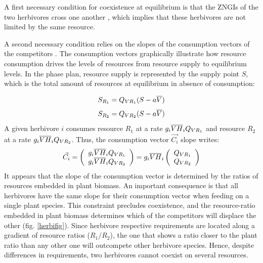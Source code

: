 \documentclass[12pt]{article}
\newcommand\barre[1]{\overline{\rule{0pt}{1.5ex}#1}}
\begin{document}
A first necessary condition for coexistence at equilibrium is that the ZNGIs of the two herbivores cross one another \citep{Tilman1982}, which implies that these herbivores are not limited by the same resource. 
\par
A second necessary condition relies on the slopes of the consumption vectors of the competitors %
\citep{Tilman1982}.  The consumption vectors graphically illustrate how resource consumption drives the levels of resources from resource supply to equilibrium levels. In the phase plan, resource supply is represented by the supply point $S$, which is the total amount of resources at equilibrium in absence of consumption:

\begin{equation}
S_{R_1}=Q_{VR_1}(S-a\barre{V})
\end{equation}
\begin{equation}
S_{R_2}=Q_{VR_2}(S-a\barre{V})
\end{equation}
A given herbivore $i$ consumes resource $R_1$ at a rate $g_i\barre{V}\barre{H}_i Q_{VR_1}$ and resource $R_2$ at a rate $g_i\barre{V}\barre{H}_i Q_{VR_2}$. Thus, 
the consumption vector $\vec{C_i}$ slope writes: 
\begin{equation}
\vec{C_i}=\left( 
\begin{array}{l}
g_i\barre{V}\barre{H}_i Q_{VR_1}\\
g_i\barre{V}\barre{H}_i Q_{VR_2}
\end{array}\right) 
=g_i\barre{V}\barre{H}_i \left( 
\begin{array}{l}
Q_{VR_1}\\
Q_{VR_2}
\end{array}\right) 
\end{equation}
It appears that the slope of the consumption vector is determined by the ratios of resources embedded in plant biomass. An important consequence is that all herbivores have the same slope for their consumption vector when feeding on a single plant species. This constraint precludes coexistence, and the resource-ratio embedded in plant biomass determines which of the competitors will displace the other (fig. \ref{herbifig}). %
Since herbivore respective requirements are located along a gradient of resource ratios ($R_1 / R_2$), the one that shows a ratio closer to the plant ratio than any other one will outcompete other herbivore species. Hence, despite differences in requirements, two herbivores cannot coexist on several resources.  %
\end{document}
